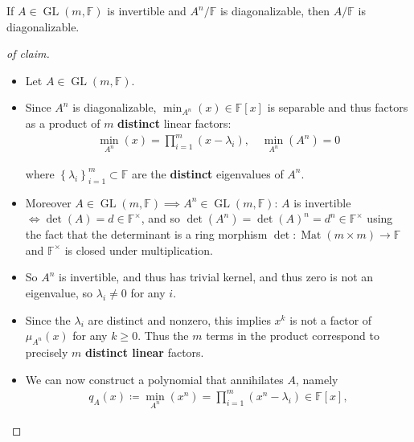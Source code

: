 \begin{solution}

\envlist

\begin{claim}

If \(A \in \operatorname{GL}(m, {\mathbb{F}})\) is invertible and
\(A^n/{\mathbb{F}}\) is diagonalizable, then \(A/{\mathbb{F}}\) is
diagonalizable.

\end{claim}

\begin{proof}[of claim]

\begin{itemize}
\item
  Let \(A \in \operatorname{GL}(m, {\mathbb{F}})\).
\item
  Since \(A^n\) is diagonalizable, \(\min_{A^n}(x) \in {\mathbb{F}}[x]\)
  is separable and thus factors as a product of \(m\) \textbf{distinct}
  linear factors:
  \begin{align*}
  \min_{A^n}(x) = \prod_{i=1}^m (x-\lambda_i), \quad \min_{A^n}(A^n) = 0
  \end{align*}

  where \(\left\{{\lambda_i}\right\}_{i=1}^m \subset {\mathbb{F}}\) are
  the \textbf{distinct} eigenvalues of \(A^n\).
\item
  Moreover
  \(A\in \operatorname{GL}(m,{\mathbb{F}}) \implies A^n \in \operatorname{GL}(m,{\mathbb{F}})\):
  \(A\) is invertible \(\iff \det(A) = d \in {\mathbb{F}}^{\times}\),
  and so \(\det(A^n) = \det(A)^n = d^n \in {\mathbb{F}}^{\times}\) using
  the fact that the determinant is a ring morphism
  \(\det: \operatorname{Mat}(m\times m) \to{\mathbb{F}}\) and
  \({\mathbb{F}}^{\times}\) is closed under multiplication.
\item
  So \(A^n\) is invertible, and thus has trivial kernel, and thus zero
  is not an eigenvalue, so \(\lambda_i \neq 0\) for any \(i\).
\item
  Since the \(\lambda_i\) are distinct and nonzero, this implies \(x^k\)
  is not a factor of \(\mu_{A^n}(x)\) for any \(k\geq 0\). Thus the
  \(m\) terms in the product correspond to precisely \(m\)
  \textbf{distinct linear} factors.
\item
  We can now construct a polynomial that annihilates \(A\), namely
  \begin{align*}
  q_A(x) \coloneqq\min_{A^n}(x^n) = \prod_{i=1}^m (x^n-\lambda_i) \in {\mathbb{F}}[x],
  \end{align*}


\end{itemize}
\end{proof}
\end{solution}
